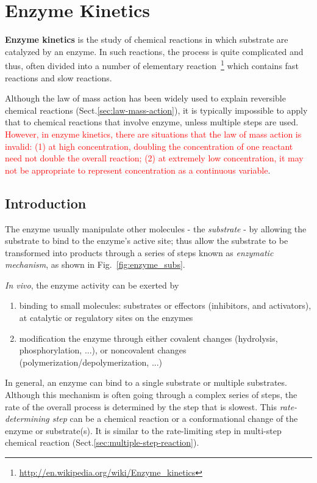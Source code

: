 \chapter{Enzyme Kinetics}
\label{chap:enzyme-kinetics}

{\bf Enzyme kinetics} is the study of chemical reactions in which substrate 
are catalyzed by an enzyme. In such reactions, the process is quite
complicated and thus, often divided into a number of elementary
reaction~\footnote{\url{http://en.wikipedia.org/wiki/Enzyme_kinetics}} which
contains fast reactions and slow reactions.

Although the law of mass action has been widely used to explain reversible
chemical reactions (Sect.\ref{sec:law-mass-action}), it is typically impossible
to apply that to chemical reactions that involve enzyme, unless multiple steps
are used. \textcolor{red}{However, in enzyme kinetics, there are
situations that the law
  of mass action is invalid: (1) at high concentration, doubling the
  concentration of one reactant need not double the overall reaction; (2) at
  extremely low concentration, it may not be appropriate to represent
  concentration as a continuous variable}.

\section{Introduction}

The enzyme usually manipulate other molecules - the {\it substrate} -
by allowing the substrate to bind to the enzyme's
active site; thus allow the substrate to be transformed into products
through a series of steps known as {\it enzymatic mechanism}, as shown
in Fig.~\ref{fig:enzyme_subs}. 

{\it In vivo}, the enzyme activity can be exerted by
\begin{enumerate}
  \item binding to small molecules: substrates or effectors (inhibitors,
  and activators), at catalytic or regulatory sites on the enzymes

  \item modification the enzyme through either covalent changes
  (hydrolysis, phosphorylation, ...), or noncovalent changes
  (polymerization/depolymerization, ...)
\end{enumerate}
In general, an enzyme can bind to a single substrate or multiple substrates.
Although this mechanism is often going through a complex series of steps, the
rate of the overall process is determined by the step that is slowest. This {\it
rate-determining step} can be a chemical reaction or a conformational change of
the enzyme or substrate(s). It is similar to the rate-limiting step in
multi-step chemical reaction (Sect.\ref{sec:multiple-step-reaction}).



